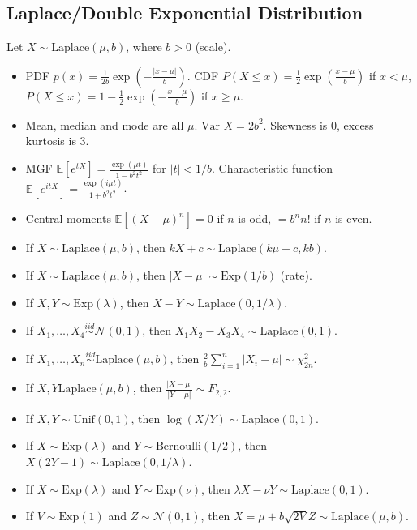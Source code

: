 \documentclass[twoside]{article}
\newcommand\bbE{\mathbb{E}}
\newcommand\calN{\mathcal{N}}
\newcommand\lmb{\lambda}
\newcommand\var{\text{Var }}
\begin{document}
\subsection{Laplace/Double Exponential Distribution}
Let $X \sim \text{Laplace}(\mu, b)$, where $b > 0$ (scale).
\begin{itemize}
\item PDF $p(x) = \displaystyle\frac{1}{2b} \exp \left( - \frac{|x - \mu|}{b} \right)$. CDF $P(X \leq x) = \displaystyle\frac{1}{2} \exp \left( \frac{x - \mu}{b} \right)$ if $x < \mu$, $P(X \leq x) = 1 - \displaystyle\frac{1}{2} \exp \left( -\frac{x - \mu}{b} \right)$ if $x \geq \mu$.

\item Mean, median and mode are all $\mu$. $\var X = 2b^2$. Skewness is 0, excess kurtosis is 3.

\item MGF $\bbE[e^{tX}] = \displaystyle\frac{\exp(\mu t)}{1 - b^2 t^2}$ for $|t| < 1/b$. Characteristic function $\bbE [e^{itX}] = \displaystyle\frac{\exp(i \mu t)}{1 + b^2 t^2}$.

\item Central moments $\bbE [(X-\mu)^n] = 0$ if $n$ is odd, $= b^n n!$ if $n$ is even.

\item If $X \sim \text{Laplace}(\mu, b)$, then $kX + c \sim \text{Laplace}(k\mu + c, kb)$.

\item If $X \sim \text{Laplace}(\mu, b)$, then $|X - \mu| \sim \text{Exp}(1/b)$ (rate).

\item If $X, Y \sim \text{Exp}(\lmb)$, then $X - Y \sim \text{Laplace}(0, 1/\lmb)$.

\item If $X_1, \dots, X_4 \stackrel{iid}{\sim} \calN(0,1)$, then $X_1 X_2 - X_3 X_4 \sim \text{Laplace}(0,1)$.

\item If $X_1, \dots, X_n \stackrel{iid}{\sim} \text{Laplace}(\mu,b)$, then $\displaystyle\frac{2}{b}\sum_{i=1}^n |X_i - \mu| \sim \chi_{2n}^2$.

\item If $X, Y \text{Laplace}(\mu, b)$, then $\displaystyle\frac{|X - \mu|}{|Y - \mu|} \sim F_{2,2}$.

\item If $X, Y \sim \text{Unif}(0,1)$, then $\log (X / Y) \sim \text{Laplace}(0,1)$.

\item If $X \sim \text{Exp}(\lmb)$ and $Y \sim \text{Bernoulli}(1/2)$, then $X(2Y - 1) \sim \text{Laplace}(0, 1/\lmb)$.

\item If $X \sim \text{Exp}(\lmb)$ and $Y \sim \text{Exp}(\nu)$, then $\lmb X - \nu Y \sim \text{Laplace}(0,1)$.

\item If $V \sim \text{Exp}(1)$ and $Z \sim \calN(0,1)$, then $X = \mu + b \sqrt{2V} Z \sim \text{Laplace}(\mu, b)$.

\end{itemize}
\end{document}
